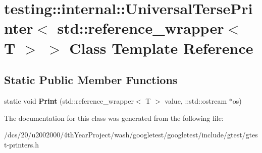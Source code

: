 \hypertarget{classtesting_1_1internal_1_1UniversalTersePrinter_3_01std_1_1reference__wrapper_3_01T_01_4_01_4}{}\section{testing\+:\+:internal\+:\+:Universal\+Terse\+Printer$<$ std\+:\+:reference\+\_\+wrapper$<$ T $>$ $>$ Class Template Reference}
\label{classtesting_1_1internal_1_1UniversalTersePrinter_3_01std_1_1reference__wrapper_3_01T_01_4_01_4}
\subsection*{Static Public Member Functions}
\begin{DoxyCompactItemize}
\item 
\mbox{\label{classtesting_1_1internal_1_1UniversalTersePrinter_3_01std_1_1reference__wrapper_3_01T_01_4_01_4_a0710fc05707697e123a8ecbd6dfed1f0}} 
static void {\bfseries Print} (std\+::reference\+\_\+wrapper$<$ T $>$ value, \+::std\+::ostream $\ast$os)
\end{DoxyCompactItemize}


The documentation for this class was generated from the following file\+:\begin{DoxyCompactItemize}
\item 
/dcs/20/u2002000/4th\+Year\+Project/wash/googletest/googletest/include/gtest/gtest-\/printers.\+h\end{DoxyCompactItemize}

